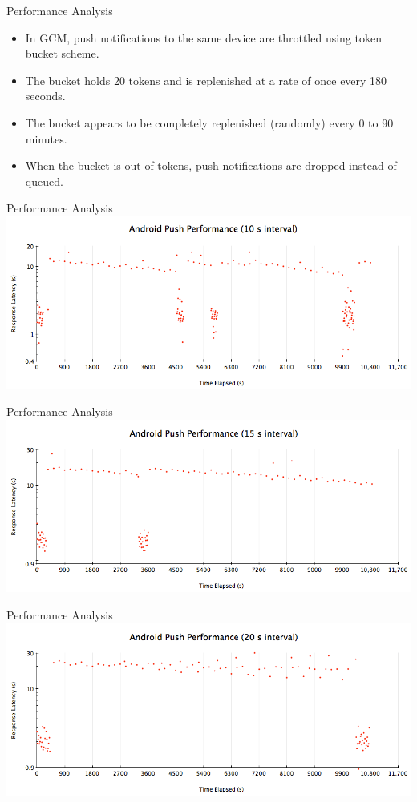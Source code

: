 \documentclass[10pt]{beamer}
\begin{document}
\begin{frame}[fragile]{Performance Analysis}
\begin{itemize}
\item In GCM, push notifications to the same device are throttled using token bucket scheme.
\item The bucket holds 20 tokens and is replenished at a rate of once every 180 seconds.
\item The bucket appears to be completely replenished (randomly) every 0 to 90 minutes. 
\item When the bucket is out of tokens, push notifications are dropped instead of queued.
\end{itemize}
\end{frame}
\begin{frame}[fragile]{Performance Analysis}
\includegraphics[width=\textwidth-10mm]{../report/images/graph1.png}
\end{frame}
\begin{frame}[fragile]{Performance Analysis}
\includegraphics[width=\textwidth-10mm]{../report/images/graph2.png}
\end{frame}
\begin{frame}[fragile]{Performance Analysis}
\includegraphics[width=\textwidth-10mm]{../report/images/graph3.png}
\end{frame}
\end{document}

